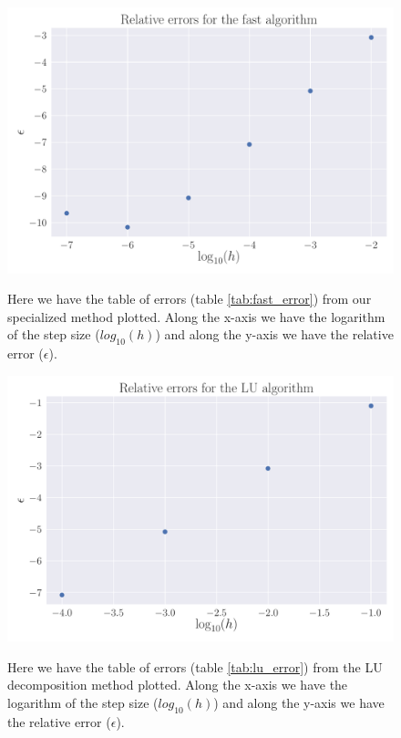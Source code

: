 \documentclass[reprint, english,notitlepage]{revtex4-1}  %
\begin{document}
\begin{figure}[h]
	\centering
	\includegraphics[scale=0.5]{../output/fast_errors.pdf}
	\label{fig:fast_error}
	\caption{Here we have the table of errors (table \ref{tab:fast_error}) from our specialized method plotted. Along the x-axis we have the logarithm of the step size ($log_{10}(h)$) and along the y-axis we have the relative error ($\epsilon$).}
\end{figure}

\begin{figure}[h]
	\centering
	\includegraphics[scale=0.5]{../output/LU_errors.pdf}
	\label{fig:lu_error}
	\caption{Here we have the table of errors (table \ref{tab:lu_error}) from the LU decomposition method plotted. Along the x-axis we have the logarithm of the step size ($log_{10}(h)$) and along the y-axis we have the relative error ($\epsilon$).}
\end{figure}
\end{document}

